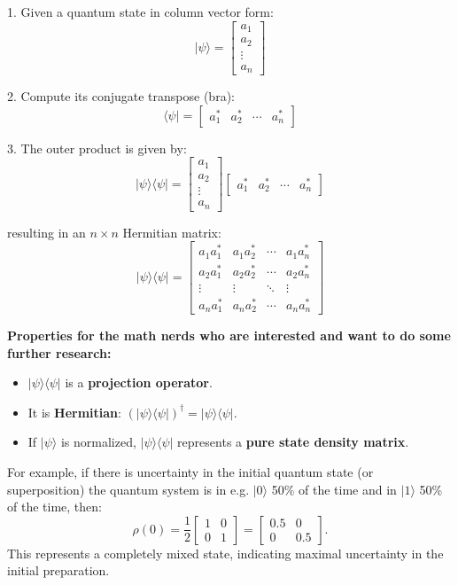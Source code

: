 \documentclass[12pt]{article}
\begin{document}
1. Given a quantum state in column vector form:
   \[
   |\psi\rangle = \begin{bmatrix} a_1 \\ a_2 \\ \vdots \\ a_n \end{bmatrix}
   \]
   
2. Compute its conjugate transpose (bra):
   \[
   \langle \psi| = \begin{bmatrix} a_1^* & a_2^* & \cdots & a_n^* \end{bmatrix}
   \]

3. The outer product is given by:
   \[
   |\psi\rangle \langle \psi| =
   \begin{bmatrix} a_1 \\ a_2 \\ \vdots \\ a_n \end{bmatrix}
   \begin{bmatrix} a_1^* & a_2^* & \cdots & a_n^* \end{bmatrix}
   \]

   resulting in an \( n \times n \) Hermitian matrix:
   \[
   |\psi\rangle \langle \psi| =
   \begin{bmatrix}
   a_1 a_1^* & a_1 a_2^* & \cdots & a_1 a_n^* \\
   a_2 a_1^* & a_2 a_2^* & \cdots & a_2 a_n^* \\
   \vdots & \vdots & \ddots & \vdots \\
   a_n a_1^* & a_n a_2^* & \cdots & a_n a_n^*
   \end{bmatrix}
   \]

\textbf{Properties for the math nerds who are interested and want to do some further research:}
\begin{itemize}
    \item \( |\psi\rangle \langle \psi| \) is a \textbf{projection operator}.
    \item It is \textbf{Hermitian}: \( (|\psi\rangle \langle \psi|)^\dagger = |\psi\rangle \langle \psi| \).
    \item If \( |\psi\rangle \) is normalized, \( |\psi\rangle \langle \psi| \) represents a \textbf{pure state density matrix}.

\end{itemize}

For example, if there is uncertainty in the initial quantum state (or superposition) the quantum system is in e.g. $|0\rangle$ 50\% of the time and in $|1\rangle$ 50\% of the time, then:
\begin{equation*}
    \rho(0) = \frac{1}{2} \begin{bmatrix} 1 & 0 \\ 0 & 1 \end{bmatrix} = \begin{bmatrix} 0.5 & 0 \\ 0 & 0.5 \end{bmatrix}.
\end{equation*}
This represents a completely mixed state, indicating maximal uncertainty in the initial preparation.
\end{document}
